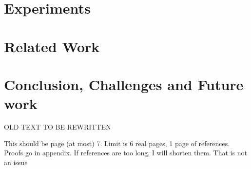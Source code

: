 \documentclass{article}
\newcommand\comment[1]{\marginpar{\parbox{\marginparwidth}{\tiny #1}}}
\renewcommand\comment[1]{#1}
\newcommand{\todo}[1]{{\comment{\color{red}\textsc{TODO:}#1} }}
\begin{document}
\section{Experiments}
\label{sec:experiments}

%  

\section{Related Work}\label{sec:related}



\section{Conclusion, Challenges and Future work}\label{sec:conclusion}
{\color{OliveGreen} OLD TEXT TO BE REWRITTEN

}

\newpage
{\color{red}This should be page (at most) 7. Limit is 6 real pages, 1 page of references. Proofs go in appendix. If references are too long, I will shorten them. That is not an issue}
\newpage

{
\footnotesize

 
}
% 
\end{document}
